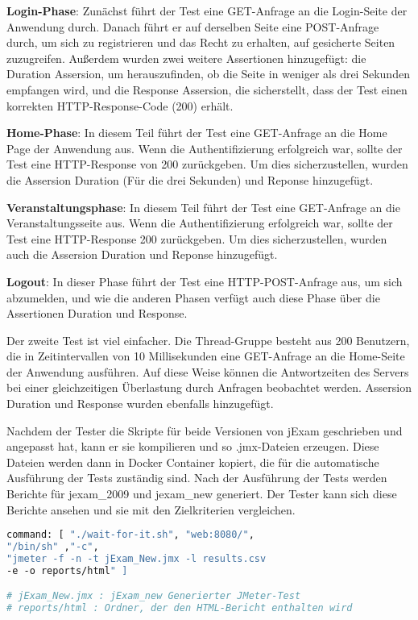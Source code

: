 \textbf{Login-Phase}: Zunächst führt der Test eine GET-Anfrage an die Login-Seite der
Anwendung durch. Danach führt er auf derselben Seite eine POST-Anfrage durch,
um sich zu registrieren und das Recht zu erhalten, auf gesicherte Seiten
zuzugreifen. Außerdem wurden zwei weitere Assertionen hinzugefügt: die
Duration Assersion, um herauszufinden, ob die Seite in weniger als drei
Sekunden empfangen wird, und die Response Assersion, die sicherstellt,
dass der Test einen korrekten HTTP-Response-Code (200) erhält.


\textbf{Home-Phase}: In diesem Teil führt der Test eine GET-Anfrage an die Home Page
der Anwendung aus. Wenn die Authentifizierung erfolgreich war, sollte der
Test eine HTTP-Response von 200 zurückgeben. Um dies sicherzustellen, wurden
die Assersion Duration (Für die drei Sekunden) und Reponse hinzugefügt.


\textbf{Veranstaltungsphase}: In diesem Teil führt der Test eine GET-Anfrage an die
Veranstaltungsseite aus. Wenn die Authentifizierung erfolgreich war, sollte
der Test eine HTTP-Response 200 zurückgeben. Um dies sicherzustellen, wurden
auch die Assersion Duration und Reponse hinzugefügt.

\textbf{Logout}: In dieser Phase führt der Test eine HTTP-POST-Anfrage aus, um sich
abzumelden, und wie die anderen Phasen verfügt auch diese Phase über die
Assertionen Duration und Response.



Der zweite Test ist viel einfacher. Die Thread-Gruppe besteht aus 200
Benutzern, die in Zeitintervallen von 10 Millisekunden eine GET-Anfrage
an die Home-Seite der Anwendung ausführen. Auf diese Weise können die
Antwortzeiten des Servers bei einer gleichzeitigen Überlastung durch
Anfragen beobachtet werden. Assersion Duration und Response wurden ebenfalls
hinzugefügt.


Nachdem der Tester die Skripte für beide Versionen von jExam geschrieben
und angepasst hat, kann er sie kompilieren und so .jmx-Dateien erzeugen.
Diese Dateien werden dann in Docker Container kopiert, die für die
automatische Ausführung der Tests zuständig sind. Nach der Ausführung der
Tests werden Berichte für \gls{jexam_2009} und \gls{jexam_new} generiert. Der Tester
kann sich diese Berichte ansehen und sie mit den Zielkriterien vergleichen.

\begin{lstlisting}[language=Dockerfile,label={lst:jmeter},caption={JMeter Ausführungsbefehl}]
    command: [ "./wait-for-it.sh", "web:8080/",
"/bin/sh" ,"-c",
"jmeter -f -n -t jExam_New.jmx -l results.csv
-e -o reports/html" ]

# jExam_New.jmx : jExam_new Generierter JMeter-Test
# reports/html : Ordner, der den HTML-Bericht enthalten wird
\end{lstlisting}
